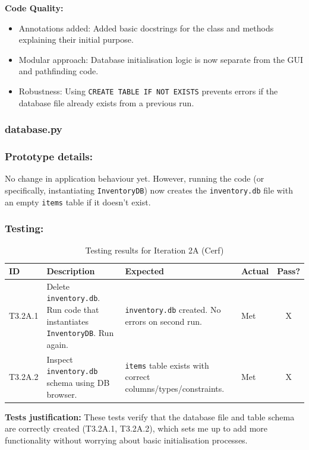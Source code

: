 \textbf{Code Quality:}
\begin{itemize}
	\item Annotations added: Added basic docstrings for the class and methods explaining their initial purpose.
	\item Modular approach: Database initialisation logic is now separate from the GUI and pathfinding code.
	\item Robustness: Using \verb|CREATE TABLE IF NOT EXISTS| prevents errors if the database file already exists from a previous run.
\end{itemize}

\subsubsection{database.py}



\newpage

\subsubsection{Prototype details:}
No change in application behaviour yet. However, running the code (or specifically, instantiating \verb|InventoryDB|) now creates the \verb|inventory.db| file with an empty \verb|items| table if it doesn't exist.

\subsubsection{Testing:}
\begin{table}[htbp]
	\centering
	\begin{tabularx}{\textwidth}{|l|X|p{4.5cm}|p{1.5cm}|c|}
		\hline
		\textbf{ID} & \textbf{Description} & \textbf{Expected} & \textbf{Actual} & \textbf{Pass?} \\
		\hline
		T3.2A.1 & Delete \verb|inventory.db|. Run code that instantiates \verb|InventoryDB|. Run again. & \verb|inventory.db| created. No errors on second run. & Met & X \\
		\hline
		T3.2A.2 & Inspect \verb|inventory.db| schema using DB browser. & \verb|items| table exists with correct columns/types/constraints. & Met & X \\
		\hline
	\end{tabularx}
	\caption{Testing results for Iteration 2A (Cerf)}
\end{table}
\textbf{Tests justification:} These tests verify that the database file and table schema are correctly created (T3.2A.1, T3.2A.2), which sets me up to add more functionality without worrying about basic initialisation processes.


